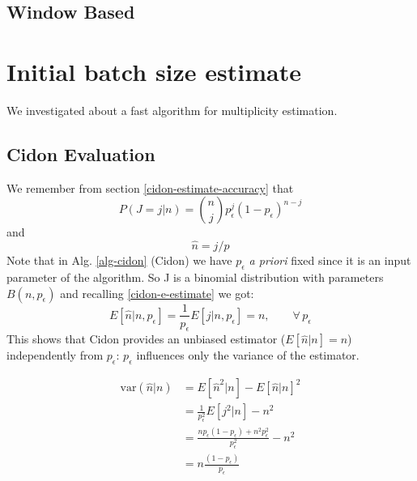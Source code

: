 \documentclass[12pt,a4paper,twocolumns]{report}
\newcommand{\pc}{p_{\epsilon}}
\begin{document}
\section{Window Based}
\chapter{Initial batch size estimate}
We investigated about a fast algorithm for multiplicity estimation.\\

\section{Cidon Evaluation}

\begin{equation*}
\end{equation*}
We remember from section \ref{cidon-estimate-accuracy} that
\begin{equation*}P(J=j|n)={n \choose j}\pc^{j}(1-\pc)^{n-j}\end{equation*}
and
\begin{equation*}\hat{n}=j/p\end{equation*}
Note that  in Alg. \ref{alg-cidon} (Cidon) we have $\pc$ \emph{a priori} fixed since it is an input parameter of the algorithm. So J is a binomial distribution with parameters $B(n,\pc)$ and recalling \eqref{cidon-e-estimate}
we got:
\begin{equation}
E[\hat{n}|n,\pc]=\frac{1}{\pc}E\left[j|n,\pc\right]=n, \qquad \forall \,\pc
\end{equation}
This shows that Cidon provides an unbiased estimator ($E[\hat{n}|n]=n$) independently from $\pc$: $\pc$ influences only the variance of the estimator. 

\begin{equation}
\begin{split}
\textrm{var}(\hat{n}|n) & =E[\hat{n}^{2}|n]- E[\hat{n}|n]^{2}\\
& = \frac{1}{\pc^{2}}E[j^{2}|n] - n^{2}\\
& = \frac{n\pc(1-\pc)+n^{2}\pc^{2}}{\pc^{2}}- n^{2}\\
& = n \frac{(1-\pc)}{\pc}
\end{split}
\end{equation}
\end{document}
